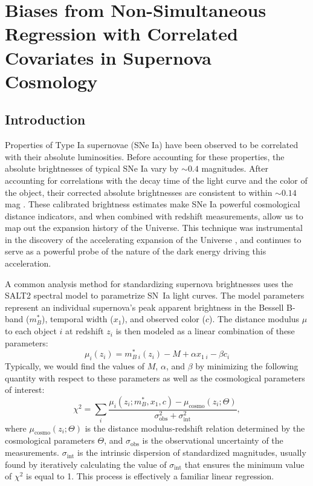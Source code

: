 \chapter{Biases from Non-Simultaneous Regression with Correlated Covariates in Supernova Cosmology}
\label{chap:reg_bias}

\newcommand{\sgn}{\text{sgn}}
\newcommand{\sigint}{\sigma_{\text{int}}}

\section{Introduction} \label{sec:intro}
Properties of Type Ia supernovae (SNe Ia) have been observed to be correlated with their absolute luminosities. Before accounting for these properties, the absolute brightnesses of typical SNe Ia vary by $\sim 0.4$ magnitudes. After accounting for correlations with the decay time of the light curve and the color of the object, their corrected absolute brightnesses are consistent to within $\sim 0.14$ mag \citep{phillips_absolute_1993, hamuy_morphology_1996, riess_precise_1996, perlmutter_measurements_1997, tripp_two-parameter_1998}. These calibrated brightness estimates make SNe Ia powerful cosmological distance indicators, and when combined with redshift measurements, allow us to map out the expansion history of the Universe. This technique was instrumental in the discovery of the accelerating expansion of the Universe \citep{perlmutter_measurements_1999, riess_observational_1998}, and continues to serve as a powerful probe of the nature of the dark energy driving this acceleration.

A common analysis method for standardizing supernova brightnesses uses the SALT2 spectral model \citep{guy_salt2_2007, betoule_improved_2014, mosher_cosmological_2014} to parametrize SN~Ia light curves. The model parameters represent an individual supernova's peak apparent brightness in the Bessell B-band ($m_B^*$), temporal width ($x_1$), and observed color ($c$). The distance modulus $\mu$ to each object $i$ at redshift $z_i$ is then modeled as a linear combination of these parameters:
\begin{equation}
    \mu_i(z_i) = m_{B\;i}^*(z_i) - M + \alpha x_{1\;i} - \beta c_i
\end{equation}
Typically, we would find the values of $M$, $\alpha$, and $\beta$ by minimizing the following quantity with respect to these parameters as well as the cosmological parameters of interest:
\begin{equation}
    \chi^2 = \displaystyle\sum_{i} \frac{\mu_i(z_i; m_B^*, x_1, c)-\mu_\text{cosmo}(z_i; \Theta)}{\sigma_\text{obs}^2+\sigint^2},
\end{equation}
where $\mu_\text{cosmo}(z_i;\Theta)$ is the distance modulus-redshift relation determined by the cosmological parameters $\Theta$, and $\sigma_\text{obs}$ is the observational uncertainty of the measurements. $\sigma_\text{int}$ is the intrinsic dispersion of standardized magnitudes, usually found by iteratively calculating the value of $\sigint$ that ensures the minimum value of $\chi^2$ is equal to 1. This process is effectively a familiar linear regression.

